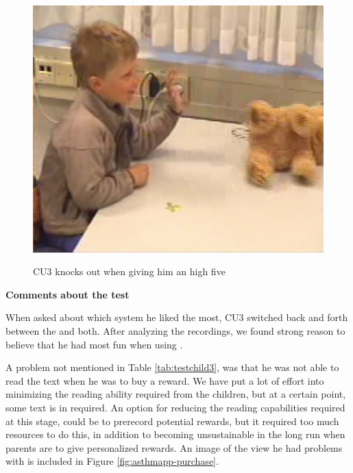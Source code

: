 \begin{figure}
\begin{minipage}[t]{0.3\linewidth}
		\label{fig:child-knockout2}
	\end{minipage}
	\hspace{0.5cm}
	\begin{minipage}[t]{0.3\linewidth}
		\centering
			\includegraphics[width=0.20\paperwidth]{Pictures/usability-pictures/knockout3.png}
		\label{fig:child-knockout3}
	\end{minipage}
	\label{fig:child-knockout}
	\caption{CU3 knocks out \ab{} when giving him an high five}
\end{figure}

\textbf{Comments about the test}

When asked about which system he liked the most, CU3 switched back and forth between the \app{} and both. After analyzing the recordings, we found strong reason to believe that he had most fun when using \app{}. 

A problem not mentioned in Table \ref{tab:testchild3}, was that he was not able to read the text when he was to buy a reward. We have put a lot of effort into minimizing the reading ability required from the children, but at a certain point, some text is in required. An option for reducing the reading capabilities required at this stage, could be to prerecord potential rewards, but it required too much resources to do this, in addition to becoming unsustainable in the long run when parents are to give personalized rewards. An image of the view he had problems with is included in Figure \ref{fig:asthmapp-purchase}.   
 
